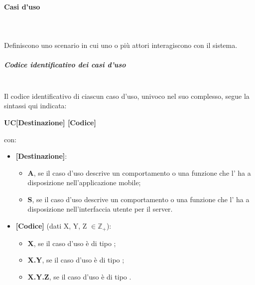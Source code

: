 \paragraph{Casi d'uso}\mbox{}\\ \\
Definiscono uno scenario in cui uno o più attori interagiscono con il sistema.
\subparagraph*{Codice identificativo dei casi d'uso}\mbox{}\\
Il codice identificativo di ciascun caso d’uso, univoco nel suo complesso, segue la sintassi qui indicata:
\begin{center}
	\textbf{UC[Destinazione] [Codice]}
\end{center}
con:
\begin{itemize}
	\item \textbf{[Destinazione]}:
		\begin{itemize}
			\item \textbf{A}, se il caso d’uso descrive un comportamento o una funzione che l’ ha a disposizione nell'applicazione mobile;
			\item \textbf{S}, se il caso d’uso descrive un comportamento o una funzione che l' ha a disposizione nell'interfaccia utente per il server.
		\end{itemize}
	\item \textbf{[Codice]} (dati X, Y, Z $\in \mathbb{Z_+}$):
	\begin{itemize}
		\item \textbf{X}, se il caso d'uso è di tipo ;
		\item \textbf{X.Y}, se il caso d'uso è di tipo ;
		\item \textbf{X.Y.Z}, se il caso d'uso è di tipo .
	\end{itemize}
\end{itemize}

